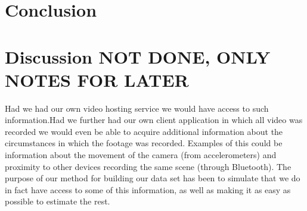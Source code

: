 %
\section{Conclusion}
%
\section{Discussion NOT DONE, ONLY NOTES FOR LATER}
%
Had we had
%
%
our own video hosting service we would have access to such information.Had we further had our own client application in which all video was recorded we would even be able to acquire additional information about the circumstances in which the footage was recorded. Examples of this could be information about the movement of the camera (from accelerometers) and proximity to other devices recording the same scene (through Bluetooth). The purpose of our method for building our data set has been to simulate that we do in fact have access to some of this information, as well as making it as easy as possible to estimate the rest.
%